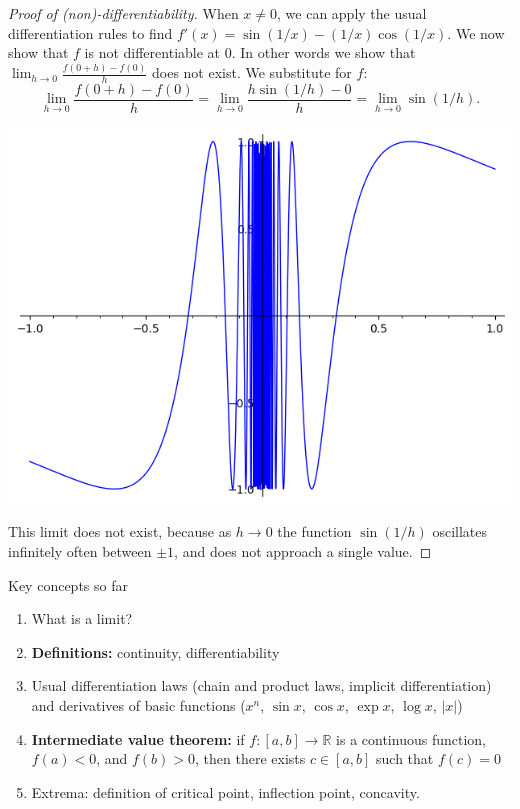 \documentclass{beamer}
\newcommand{\R}{\mathbb{R}}
\begin{document}
\begin{frame}
\begin{proof}[Proof of (non)-differentiability]
  When $ x \neq 0 $, we can apply the usual differentiation rules to find $ f'(x) = \sin(1/x) - (1/x)  \cos(1/x) $. We now show that $ f $ is not
  differentiable at $ 0 $. In other words we show that $ \lim_{h \to 0} \frac{f(0+h) - f(0)}{h} $ does not exist. We substitute for $ f $:
  \begin{displaymath}
    \lim_{h \to 0} \frac{f(0+h) - f(0)}{h} = \lim_{h \to 0} \frac{h \sin(1/h) - 0}{h} = \lim_{h \to 0} \sin(1/h).
  \end{displaymath}

  \begin{center}
  \includegraphics[width=.3\textwidth]{sinx}
  \end{center}

  This limit does not exist, because as $ h \to 0 $ the function $ \sin(1/h) $ oscillates infinitely often between $ \pm 1 $, and does not approach a single value.
\end{proof}
\end{frame}


\begin{frame}{Key concepts so far}
\begin{enumerate}
  \item What is a limit?
  \item \textbf{Definitions:} continuity, differentiability
  \item Usual differentiation laws (chain and product laws, implicit differentiation) and derivatives of basic functions ($ x^n $, $ \sin x $, $ \cos x  $, $ \exp x $, $ \log x $, $ \lvert x \rvert $)
  \item \textbf{Intermediate value theorem:} if $ f : [a,b] \to \R $ is a continuous function, $ f(a) < 0 $, and $ f(b) > 0 $, then there exists $ c \in [a,b] $ such that $ f(c) = 0 $
  \item Extrema: definition of critical point, inflection point, concavity.
\end{enumerate}
\end{frame}
\end{document}
